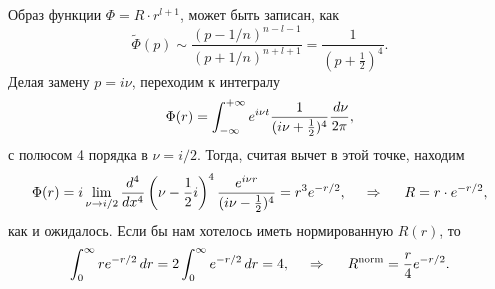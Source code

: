 Образ функции $\Phi = R \cdot r^{l+1}$, может быть записан, как
\begin{equation*}
    \tilde{\Phi} (p) \sim \frac{(p-1/n)^{n-l-1}}{(p+1/n)^{n+l+1}} = \frac{1}{(p+\frac{1}{2})^4}.
\end{equation*}
Делая замену $p = i \nu$, переходим к интегралу
\begin{equation*}
    \Phi(r) = \int_{-\infty}^{+\infty} 
    e^{i \nu t} \frac{1}{(i \nu + \tfrac{1}{2})^4}
    \frac{\, d \nu}{2\pi},
\end{equation*}
с полюсом 4 порядка в $\nu = i/2$. Тогда, считая вычет в этой точке, находим
\begin{equation*}
    \Phi(r) = i \lim_{\nu \to i/2} \frac{d^4}{d x^4}  \left(
        \nu - \frac{1}{2}i
    \right)^4 \frac{e^{i \nu r}}{(i \nu - \tfrac{1}{2})^4} = r^3 e^{-r/2},
    \hspace{0.5cm} \Rightarrow \hspace{0.5cm}
    R = r \cdot e^{-r/2},
\end{equation*}
как и ожидалось. Если бы нам хотелось иметь нормированную $R(r)$, то
\begin{equation*}
    \int_{0}^{\infty} r e^{-r/2} \, d r = 2 \int_{0}^{\infty} e^{-r/2} \, d r = 4,
    \hspace{0.5cm} \Rightarrow \hspace{0.5cm}
    R^{\text{norm}} = \frac{r}{4} e^{-r/2}.
\end{equation*}





